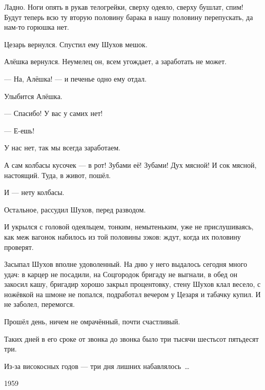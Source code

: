 Ладно. Ноги опять в рукав телогрейки, сверху одеяло, сверху бушлат, спим! Будут теперь всю ту вторую половину барака в нашу половину перепускать, да нам-то горюшка нет.

Цезарь вернулся. Спустил ему Шухов мешок.

Алёшка вернулся. Неумелец он, всем угождает, а заработать не может.

--- На, Алёшка! --- и печенье одно ему отдал.

Улыбится Алёшка.

--- Спасибо! У вас у самих нет!

--- Е-ешь!

У нас нет, так мы всегда заработаем.

А сам колбасы кусочек --- в рот! Зубами её! Зубами! Дух мясной! И сок мясной, настоящий. Туда, в живот, пошёл.

И --- нету колбасы.

Остальное, рассудил Шухов, перед разводом.

И укрылся с головой одеяльцем, тонким, немытеньким, уже не прислушиваясь, как меж вагонок набилось из той половины зэков: ждут, когда их половину проверят.


Засыпал Шухов вполне удоволенный. На дню у него выдалось сегодня много удач: в карцер не посадили, на Соцгородок бригаду не выгнали, в обед он закосил кашу, бригадир хорошо закрыл процентовку, стену Шухов клал весело, с ножёвкой на шмоне не попался, подработал вечером у Цезаря и табачку купил. И не заболел, перемогся.

Прошёл день, ничем не омрачённый, почти счастливый.


Таких дней в его сроке от звонка до звонка было три тысячи шестьсот пятьдесят три.

Из-за високосных годов --- три дня лишних набавлялось~\dots{}


1959
\bye
